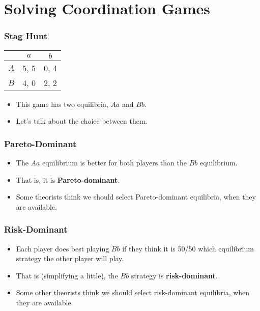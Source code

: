 \section{Solving Coordination Games}
\label{solvingcoordinationgames}

\begin{frame}

\frametitle{Stag Hunt}
\label{staghunt}


\begin{center}
\begin{tabular}{r | c c}
& $a$ & $b$  \\\hline
$A$ & 5, 5 & 0, 4 \\
$B$ & 4, 0 & 2, 2
\end{tabular}
\end{center}


\begin{itemize}
\item This game has two equilibria, $Aa$ and $Bb$.

\item Let's talk about the choice between them.

\end{itemize}
\end{frame}

\begin{frame}

\frametitle{Pareto-Dominant}
\label{pareto-dominant}

\begin{itemize}
\item The $Aa$ equilibrium is better for both players than the $Bb$ equilibrium.

\item That is, it is \textbf{Pareto-dominant}.

\item Some theorists think we should select Pareto-dominant equilibria, when they are available.

\end{itemize}
\end{frame}

\begin{frame}

\frametitle{Risk-Dominant}
\label{risk-dominant}

\begin{itemize}
\item Each player does best playing $Bb$ if they think it is 50\slash 50 which equilibrium strategy the other player will play.

\item That is (simplifying a little), the $Bb$ strategy is \textbf{risk-dominant}.

\item Some other theorists think we should select risk-dominant equilibria, when they are available.

\end{itemize}
\end{frame}

